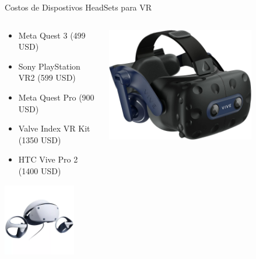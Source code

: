 \begin{frame}{Costos de Dispostivos HeadSets para VR}
\begin{columns}
\begin{column}{0.49\textwidth}
\begin{itemize}
\item Meta Quest 3 (499 USD)
\item Sony PlayStation VR2 (599 USD)
\item Meta Quest Pro (900 USD)
\item Valve Index VR Kit (1350 USD)
\item HTC Vive Pro 2 (1400 USD)
\end{itemize}

\begin{center}
\includegraphics[width=0.75\textwidth]{Figs/sony.png}
\end{center}
\end{column}
\begin{column}{0.49\textwidth}
\begin{center}
\includegraphics[width=0.75\textwidth]{Figs/HTC.jpg}\\

\end{center}
\end{column}
\end{columns}
\end{frame}
